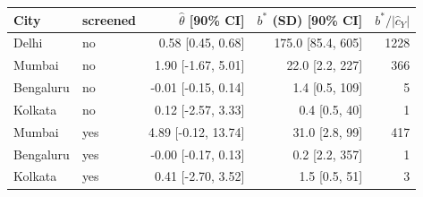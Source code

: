 \begin{tabular}{llrrr}
\toprule
City & screened & $\hat\theta$ [90\% CI] & $b^*$ (SD) [90\% CI] & $b^*/|\hat c_Y|$ \\
\midrule
Delhi & no & 0.58 [0.45, 0.68] & 175.0 [85.4, 605] & 1228 \\
Mumbai & no & 1.90 [-1.67, 5.01] & 22.0 [2.2, 227] & 366 \\
Bengaluru & no & -0.01 [-0.15, 0.14] & 1.4 [0.5, 109] & 5 \\
Kolkata & no & 0.12 [-2.57, 3.33] & 0.4 [0.5, 40] & 1 \\
Mumbai & yes & 4.89 [-0.12, 13.74] & 31.0 [2.8, 99] & 417 \\
Bengaluru & yes & -0.00 [-0.17, 0.13] & 0.2 [2.2, 357] & 1 \\
Kolkata & yes & 0.41 [-2.70, 3.52] & 1.5 [0.5, 51] & 3 \\
\bottomrule
\end{tabular}